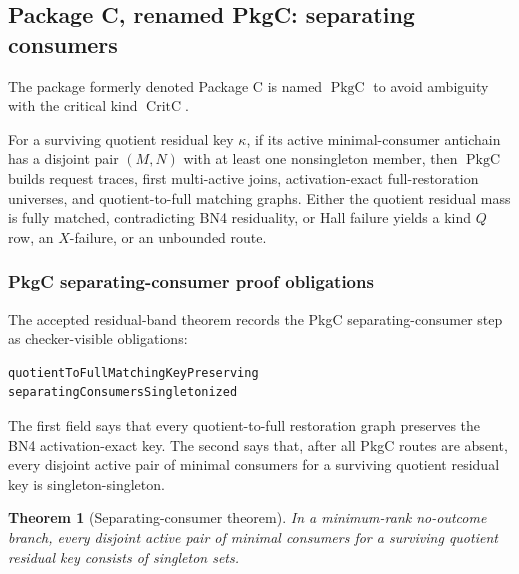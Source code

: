 \documentclass[10.5pt,a4paper]{article}
\newtheorem{theorem}{Theorem}[section]
\newcommand{\CritC}{\operatorname{CritC}}
\newcommand{\PkgC}{\operatorname{PkgC}}
\begin{document}
\subsection{Package C, renamed PkgC: separating consumers}
The package formerly denoted Package C is named \(\PkgC\) to avoid ambiguity with the critical kind \(\CritC\).

For a surviving quotient residual key \(\kappa\), if its active minimal-consumer antichain has a disjoint pair \((M,N)\) with at least one nonsingleton member, then \(\PkgC\) builds request traces, first multi-active joins, activation-exact full-restoration universes, and quotient-to-full matching graphs. Either the quotient residual mass is fully matched, contradicting BN4 residuality, or Hall failure yields a kind \(Q\) row, an \(X\)-failure, or an unbounded route.

\subsubsection{PkgC separating-consumer proof obligations}
The accepted residual-band theorem records the PkgC separating-consumer step as checker-visible obligations:
\begin{lstlisting}
quotientToFullMatchingKeyPreserving
separatingConsumersSingletonized
\end{lstlisting}
The first field says that every quotient-to-full restoration graph preserves the BN4 activation-exact key.  The second says that, after all PkgC routes are absent, every disjoint active pair of minimal consumers for a surviving quotient residual key is singleton-singleton.

\begin{theorem}[Separating-consumer theorem]
In a minimum-rank no-outcome branch, every disjoint active pair of minimal consumers for a surviving quotient residual key consists of singleton sets.
\end{theorem}
\end{document}
